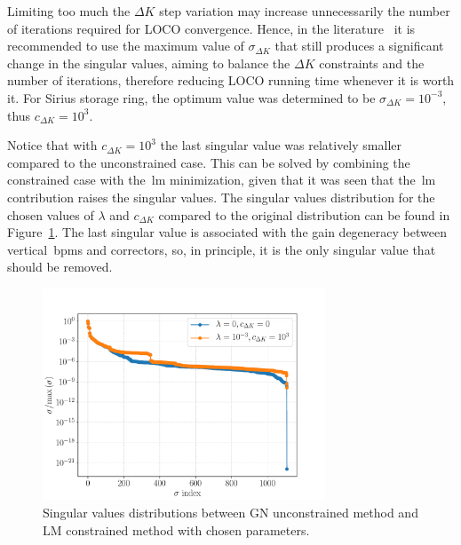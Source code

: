 Limiting too much the $\Delta K$ step variation may increase unnecessarily the number of iterations required for LOCO convergence. Hence, in the literature~\cite{icfa_huang, huang2013} it is recommended to use the maximum value of $\sigma_{\Delta K}$ that still produces a significant change in the singular values, aiming to balance the $\Delta K$ constraints and the number of iterations, therefore reducing LOCO running time whenever it is worth it. For Sirius storage ring, the optimum value was determined to be $\sigma_{\Delta K} = 10^{-3}$, thus $c_{\Delta K} = 10^{3}$.

Notice that with $c_{\Delta K}=10^{3}$ the last singular value was relatively smaller compared to the unconstrained case. This can be solved by combining the constrained case with the~\gls{lm} minimization, given that it was seen that the~\gls{lm} contribution raises the singular values. The singular values distribution for the chosen values of $\lambda$ and $c_{\Delta K}$ compared to the original distribution can be found in Figure~\ref{fig:compare_svs}. The last singular value is associated with the gain degeneracy between vertical~\glspl{bpm} and correctors, so, in principle, it is the only singular value that should be removed.
\begin{figure}
\centering
\includegraphics[width=0.75\textwidth]{figures/chosen_singular_values.pdf}
\caption{Singular values distributions between GN unconstrained method and LM constrained method with chosen parameters.}
\label{fig:compare_svs}
\end{figure}